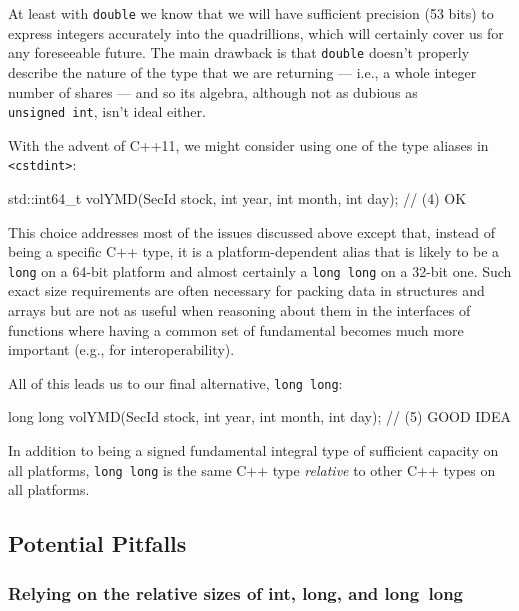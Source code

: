 \noindent At least with \lstinline!double! we know that we will have sufficient precision (53 bits) to express
integers accurately into the quadrillions, which will certainly cover us
for any foreseeable future. The main drawback is that \lstinline!double!
doesn't properly describe the nature of the type that we are returning
--- i.e., a whole integer number of shares --- and so its algebra,
although not as dubious as \lstinline!unsigned!~\lstinline!int!, isn't ideal
either.

With the advent of C++11, we might consider using one of the type aliases
in \lstinline!<cstdint>!:

\begin{emcppslisting}[language=C++]
std::int64_t volYMD(SecId stock, int year, int month, int day);  // (4) OK
\end{emcppslisting}
    
\noindent This choice addresses most of the issues discussed above except that,
instead of being a specific C++ type, it is a platform-dependent alias
that is likely to be a \lstinline!long! on a 64-bit platform and almost
certainly a \lstinline!long!~\lstinline!long! on a 32-bit one. Such exact size
requirements are often necessary for packing data in structures and
arrays but are not as useful when reasoning about them in the
interfaces of functions where having a common set of fundamental
 becomes much more important (e.g., for
interoperability).

All of this leads us to our final alternative, \lstinline!long!~\lstinline!long!:

\begin{emcppslisting}[language=C++]
long long volYMD(SecId stock, int year, int month, int day);  // (5) GOOD IDEA
\end{emcppslisting}
    
\noindent In addition to being a signed fundamental integral type of sufficient
capacity on all platforms, \lstinline!long!~\lstinline!long! is the same C++
type \emph{relative} to other C++ types on all platforms.

\subsection[Potential Pitfalls]{Potential Pitfalls}\label{longlong-potential-pitfalls}

\subsubsection[Relying on the relative sizes of \lstinline!int!, \lstinline!long!, and \lstinline!long!~\lstinline!long!]{Relying on the relative sizes of {\SubsubsecCode int}, {\SubsubsecCode long}, and {\SubsubsecCode long}~{\SubsubsecCode long}}\label{relying-on-the-relative-sizes-of-int,-long,-and-long-long}

